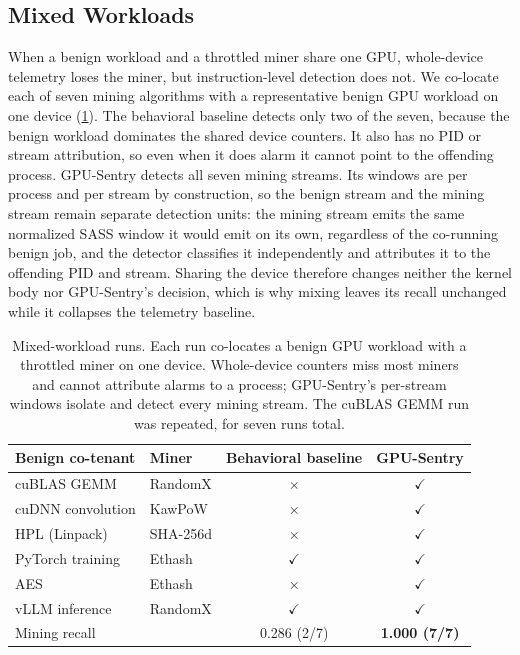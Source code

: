 \subsection{Mixed Workloads}

When a benign workload and a throttled miner share one GPU, whole-device telemetry loses the miner, but instruction-level detection does not. We co-locate each of seven mining algorithms with a representative benign GPU workload on one device (\cref{tab:mixed}). The behavioral baseline detects only two of the seven, because the benign workload dominates the shared device counters. It also has no PID or stream attribution, so even when it does alarm it cannot point to the offending process. GPU-Sentry detects all seven mining streams. Its windows are per process and per stream by construction, so the benign stream and the mining stream remain separate detection units: the mining stream emits the same normalized SASS window it would emit on its own, regardless of the co-running benign job, and the detector classifies it independently and attributes it to the offending PID and stream. Sharing the device therefore changes neither the kernel body nor GPU-Sentry's decision, which is why mixing leaves its recall unchanged while it collapses the telemetry baseline.

\begin{table}[t]
    \centering
    \caption{Mixed-workload runs. Each run co-locates a benign GPU workload with a throttled miner on one device. Whole-device counters miss most miners and cannot attribute alarms to a process; GPU-Sentry's per-stream windows isolate and detect every mining stream. The cuBLAS GEMM run was repeated, for seven runs total.}
    \label{tab:mixed}
    \small
    \begin{tabular}{llcc}
        \toprule
        Benign co-tenant & Miner & Behavioral baseline & GPU-Sentry \\
        \midrule
        cuBLAS GEMM & RandomX & $\times$ & $\checkmark$ \\
        cuDNN convolution & KawPoW & $\times$ & $\checkmark$ \\
        HPL (Linpack) & SHA-256d & $\times$ & $\checkmark$ \\
        PyTorch training & Ethash & $\checkmark$ & $\checkmark$ \\
        AES & Ethash & $\times$ & $\checkmark$ \\
        vLLM inference & RandomX & $\checkmark$ & $\checkmark$ \\
        \midrule
        \multicolumn{2}{l}{Mining recall} & 0.286 (2/7) & \textbf{1.000 (7/7)} \\
        \bottomrule
    \end{tabular}
\end{table}



